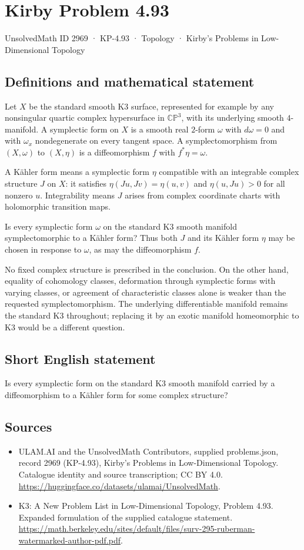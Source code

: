 \documentclass[11pt,a4paper]{article}
\begin{document}
\section*{Kirby Problem 4.93}\label{2969}
{\small UnsolvedMath ID 2969 · KP-4.93 · Topology · Kirby's Problems in Low-Dimensional Topology}
\subsection{Definitions and mathematical statement}
Let $X$ be the standard smooth K3 surface, represented for example
by any nonsingular quartic complex hypersurface in
$\mathbb{CP}^3$, with its underlying smooth $4$-manifold.
A symplectic form on $X$ is a smooth real $2$-form $\omega$
with $d\omega=0$ and with $\omega_x$ nondegenerate on every
tangent space. A symplectomorphism from $(X,\omega)$ to
$(X,\eta)$ is a diffeomorphism $f$ with $f^*\eta=\omega$.

A K\"ahler form means a symplectic form $\eta$ compatible with
an integrable complex structure $J$ on $X$: it satisfies
$\eta(Ju,Jv)=\eta(u,v)$ and $\eta(u,Ju)>0$ for all nonzero
$u$. Integrability means $J$ arises from complex coordinate
charts with holomorphic transition maps.

Is every symplectic form $\omega$ on the standard K3 smooth
manifold symplectomorphic to a K\"ahler form? Thus both $J$
and its K\"ahler form $\eta$ may be chosen in response to
$\omega$, as may the diffeomorphism $f$.

No fixed complex structure is prescribed in the conclusion.
On the other hand, equality of cohomology classes, deformation
through symplectic forms with varying classes, or agreement of
characteristic classes alone is weaker than the requested
symplectomorphism. The underlying differentiable manifold remains
the standard K3 throughout; replacing it by an exotic manifold
homeomorphic to K3 would be a different question.
\subsection{Short English statement}
Is every symplectic form on the standard K3 smooth manifold carried by a diffeomorphism to a Kähler form for some complex structure?
\subsection{Sources}
\begin{itemize}
\item[S1] ULAM.AI and the UnsolvedMath Contributors, supplied problems.json, record 2969 (KP-4.93), Kirby's Problems in Low-Dimensional Topology. Catalogue identity and source transcription; CC BY 4.0.
\url{https://huggingface.co/datasets/ulamai/UnsolvedMath}.
\item[S2] K3: A New Problem List in Low-Dimensional Topology, Problem 4.93. Expanded formulation of the supplied catalogue statement.
\url{https://math.berkeley.edu/sites/default/files/surv-295-ruberman-watermarked-author-pdf.pdf}.
\end{itemize}
\end{document}

